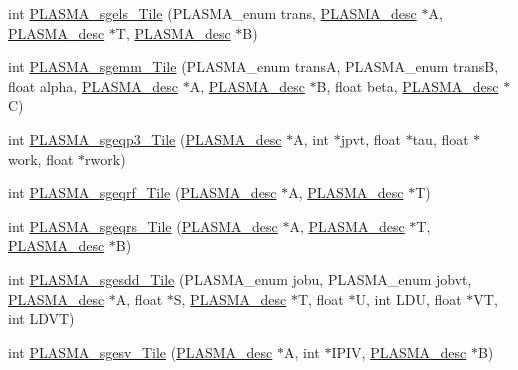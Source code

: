 \begin{DoxyCompactItemize}
\item 
int \hyperlink{group__float__Tile_ga887751384d11e2b2324e15eb59aeb58d_ga887751384d11e2b2324e15eb59aeb58d}{P\+L\+A\+S\+M\+A\+\_\+sgels\+\_\+\+Tile} (P\+L\+A\+S\+M\+A\+\_\+enum trans, \hyperlink{structplasma__desc__t}{P\+L\+A\+S\+M\+A\+\_\+desc} $\ast$A, \hyperlink{structplasma__desc__t}{P\+L\+A\+S\+M\+A\+\_\+desc} $\ast$T, \hyperlink{structplasma__desc__t}{P\+L\+A\+S\+M\+A\+\_\+desc} $\ast$B)
\item 
int \hyperlink{group__float__Tile_ga6d536762bed042f104f5b730b82fa49b_ga6d536762bed042f104f5b730b82fa49b}{P\+L\+A\+S\+M\+A\+\_\+sgemm\+\_\+\+Tile} (P\+L\+A\+S\+M\+A\+\_\+enum trans\+A, P\+L\+A\+S\+M\+A\+\_\+enum trans\+B, float alpha, \hyperlink{structplasma__desc__t}{P\+L\+A\+S\+M\+A\+\_\+desc} $\ast$A, \hyperlink{structplasma__desc__t}{P\+L\+A\+S\+M\+A\+\_\+desc} $\ast$B, float beta, \hyperlink{structplasma__desc__t}{P\+L\+A\+S\+M\+A\+\_\+desc} $\ast$C)
\item 
int \hyperlink{group__float__Tile_ga5947ee719bb85214b3347d6c0066f413_ga5947ee719bb85214b3347d6c0066f413}{P\+L\+A\+S\+M\+A\+\_\+sgeqp3\+\_\+\+Tile} (\hyperlink{structplasma__desc__t}{P\+L\+A\+S\+M\+A\+\_\+desc} $\ast$A, int $\ast$jpvt, float $\ast$tau, float $\ast$work, float $\ast$rwork)
\item 
int \hyperlink{group__float__Tile_ga7c5ef5b73dada9d9560e8fbed71971c9_ga7c5ef5b73dada9d9560e8fbed71971c9}{P\+L\+A\+S\+M\+A\+\_\+sgeqrf\+\_\+\+Tile} (\hyperlink{structplasma__desc__t}{P\+L\+A\+S\+M\+A\+\_\+desc} $\ast$A, \hyperlink{structplasma__desc__t}{P\+L\+A\+S\+M\+A\+\_\+desc} $\ast$T)
\item 
int \hyperlink{group__float__Tile_ga9f069cadfcd63ff8013e2e25079830d0_ga9f069cadfcd63ff8013e2e25079830d0}{P\+L\+A\+S\+M\+A\+\_\+sgeqrs\+\_\+\+Tile} (\hyperlink{structplasma__desc__t}{P\+L\+A\+S\+M\+A\+\_\+desc} $\ast$A, \hyperlink{structplasma__desc__t}{P\+L\+A\+S\+M\+A\+\_\+desc} $\ast$T, \hyperlink{structplasma__desc__t}{P\+L\+A\+S\+M\+A\+\_\+desc} $\ast$B)
\item 
int \hyperlink{group__float__Tile_ga7468a0b96b97ae0eef8975c7e9e05a68_ga7468a0b96b97ae0eef8975c7e9e05a68}{P\+L\+A\+S\+M\+A\+\_\+sgesdd\+\_\+\+Tile} (P\+L\+A\+S\+M\+A\+\_\+enum jobu, P\+L\+A\+S\+M\+A\+\_\+enum jobvt, \hyperlink{structplasma__desc__t}{P\+L\+A\+S\+M\+A\+\_\+desc} $\ast$A, float $\ast$S, \hyperlink{structplasma__desc__t}{P\+L\+A\+S\+M\+A\+\_\+desc} $\ast$T, float $\ast$U, int L\+D\+U, float $\ast$V\+T, int L\+D\+V\+T)
\item 
int \hyperlink{group__float__Tile_gaff4ad087d2efc588d2ca4152c4edd398_gaff4ad087d2efc588d2ca4152c4edd398}{P\+L\+A\+S\+M\+A\+\_\+sgesv\+\_\+\+Tile} (\hyperlink{structplasma__desc__t}{P\+L\+A\+S\+M\+A\+\_\+desc} $\ast$A, int $\ast$I\+P\+I\+V, \hyperlink{structplasma__desc__t}{P\+L\+A\+S\+M\+A\+\_\+desc} $\ast$B)

\end{DoxyCompactItemize}
